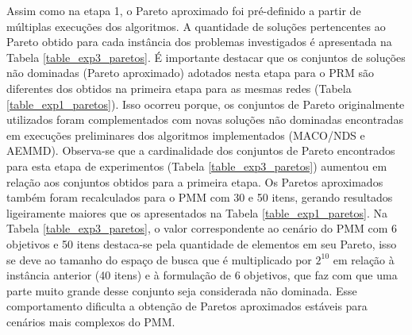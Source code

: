 Assim como na etapa 1, o Pareto aproximado foi pré-definido a partir de múltiplas execuções dos algoritmos. A quantidade de soluções pertencentes ao Pareto obtido para cada instância dos problemas investigados é apresentada na Tabela \ref{table_exp3_paretos}. É importante destacar que os conjuntos de soluções não dominadas (Pareto aproximado) adotados nesta etapa para o PRM são diferentes dos obtidos na primeira etapa para as mesmas redes (Tabela \ref{table_exp1_paretos}). Isso ocorreu porque, os conjuntos de Pareto originalmente utilizados \cite{Franca2017} foram complementados com novas soluções não dominadas encontradas em execuções preliminares dos algoritmos implementados (MACO/NDS e AEMMD). Observa-se que a cardinalidade dos conjuntos de Pareto encontrados para esta etapa de experimentos (Tabela \ref{table_exp3_paretos}) aumentou em relação aos conjuntos obtidos para a primeira etapa. Os Paretos aproximados também foram recalculados para o PMM com 30 e 50 itens, gerando resultados ligeiramente maiores que os apresentados na Tabela \ref{table_exp1_paretos}. Na Tabela \ref{table_exp3_paretos}, o valor correspondente ao cenário do PMM com 6 objetivos e 50 itens destaca-se pela quantidade de elementos em seu Pareto, isso se deve ao tamanho do espaço de busca que é multiplicado por $2^{10}$ em relação à instância anterior (40 itens) e à formulação de 6 objetivos, que faz com que uma parte muito grande desse conjunto seja considerada não dominada. Esse comportamento dificulta a obtenção de Paretos aproximados estáveis para cenários mais complexos do PMM.

